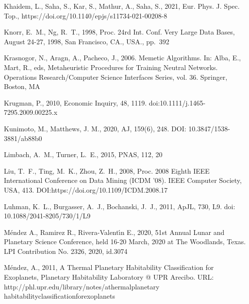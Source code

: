\documentclass[fleqn,usenatbib]{mnras}
\begin{document}
\begin{thebibliography}{99}
 Khaidem, L., Saha, S., Kar, S., Mathur, A., Saha, S., 2021, Eur. Phys. J. Spec. Top., https://doi.org/10.1140/epjs/s11734-021-00208-8

 Knorr, E.~M., Ng, R.~T., 1998, Proc. 24rd Int. Conf. Very Large Data Bases, August 24-27, 1998, San Francisco, CA., USA., pp.~392

 Krasnogor, N., Aragn, A., Pacheco, J., 2006. Memetic Algorithms. In: Alba, E., Mart, R., eds, Metaheuristic Procedures for Training Neutral Networks. Operations Research/Computer Science Interfaces Series, vol. 36. Springer, Boston, MA

 Krugman, P., 2010, Economic Inquiry, 48, 1119. doi:10.1111/j.1465-7295.2009.00225.x

 Kunimoto, M., Matthews, J. M.,  2020, AJ, 159(6), 248. DOI: 10.3847/1538-3881/ab88b0

 Limbach, A.~M., Turner, L.~E., 2015, PNAS, 112, 20

 Liu, T.~F., Ting, M.~K., Zhou, Z.~H., 2008, Proc. 2008 Eighth IEEE International Conference on Data Mining (ICDM '08). IEEE Computer Society, USA, 413. DOI:https://doi.org/10.1109/ICDM.2008.17

 Luhman, K.~L., Burgasser, A.~J., Bochanski, J.~J., 2011, ApJL, 730, L9. doi: 10.1088/2041-8205/730/1/L9


 M{\'e}ndez A., Ramirez R., Rivera-Valent{\'\i}n E., 2020, 51st Annual Lunar and Planetary Science Conference, held 16-20 March, 2020 at The Woodlands, Texas. LPI Contribution No. 2326, 2020, id.3074


 M{\'e}ndez, A., 2011, A Thermal Planetary Habitability Classification for Exoplanets, Planetary Habitability Laboratory @ UPR Arecibo. URL: http://phl.upr.edu/library/notes/athermalplanetary\\habitabilityclassificationforexoplanets



\end{thebibliography}
\end{document}

